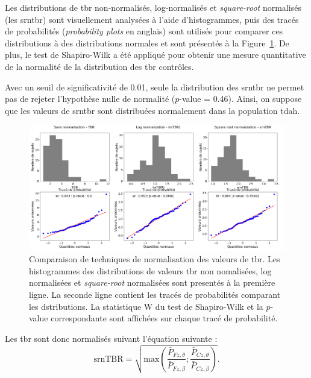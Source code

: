 Les distributions de \gls{tbr} non-normalisés, log-normalisés et \textit{square-root} normalisés (les \gls{srntbr}) sont visuellement analysées à l'aide 
d'histogrammes, puis des tracés de probabilités (\textit{probability plots} en anglais) sont utilisés pour comparer ces distributions à des distributions normales 
et sont présentés à la Figure~\ref{Figure:tbr_normalization}. De plus, le test de Shapiro-Wilk \citep{Shapiro1965} a été appliqué pour obtenir une mesure quantitative 
de la normalité de la distribution des \gls{tbr} contrôles. 

Avec un seuil de significativité de 0.01, seule la distribution des \gls{srntbr} ne permet pas de rejeter l'hypothèse
nulle de normalité ($p$-value = 0.46). Ainsi, on suppose que les valeurs de \gls{srntbr} sont distribuées normalement dans la population \gls{tdah}. 

\begin{figure}[h!]
  \centering
	\includegraphics[width=1.0\linewidth]{figures/chapter-4/tbr-normalization} 
  \caption[Comparaison de techniques de normalisation des valeurs de \gls{tbr}.]{Comparaison de techniques de normalisation des valeurs de \gls{tbr}. 
	Les histogrammes des distributions de valeurs \gls{tbr} non nomalisées,
	log normalisées et \textit{square-root} normalisées sont presentés à la première ligne. La seconde ligne contient les tracés de probabilités comparant les
	dstributions. La statistique W du test de Shapiro-Wilk et la $p$-value correspondante sont affichées sur chaque tracé de probabilité.}
  \label{Figure:tbr_normalization}
\end{figure}

Les \gls{tbr} sont donc normalisés suivant l'équation suivante :
\begin{equation}
\label{eq:tbr_srntbr_computation}
\text{srnTBR} = \sqrt{ \text{max}(\frac{\bar{P}_{Fz,\theta}}{\bar{P}_{Fz,\beta} } ; \frac{\bar{P}_{Cz,\theta}}{\bar{P}_{Cz,\beta}} ) }.
\end{equation}

